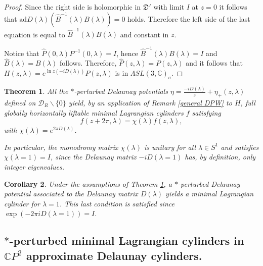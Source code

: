 \documentclass[a4paper,11pt]{amsart}
\newtheorem{theorem}{Theorem}[section]
\newtheorem{corollary}[theorem]{Corollary}
\theoremstyle{definition}
\numberwithin{equation}{section}
\newcommand{\C}{\mathbb{C}}
\begin{document}
\begin{proof}
Since the right side is holomorphic in $\mathfrak{D}'$ with limit $I$ at $z = 0$ it follows that $\mathrm{ad} D(\lambda) (\hat{B}^{-1}(\lambda)B(\lambda))=0$ holds.
Therefore the left side of the last equation is equal to  $\hat{B}^{-1}(\lambda) B(\lambda)$ and 
  constant in $z$.
 
 
  
  Notice that $\hat{P}(0, \lambda)P^{-1}(0, \lambda)=I$, hence $\hat{B}^{-1}(\lambda) B(\lambda)=I$ and $\hat{B}(\lambda)=B(\lambda)$ follows. Therefore, $\hat{P}(z,\lambda)=P(z,\lambda)$
  and it follows that $H(z,\lambda)=e^{\ln z (-iD(\lambda))}P(z,\lambda)$ is in $\Lambda SL(3,\mathbb{C})_{\sigma}$. 
 \end{proof}
 

\begin{theorem}\label{cor:1} 
All the  $*$-perturbed Delaunay potentials $\eta=\frac{-i D(\lambda)}{z}+\eta_+(z,\lambda)$ defined on $\mathcal{D}_R\backslash\{0\}$ 
yield, by an application of Remark \ref{general DPW}  to $H$,  full globally horizontally liftable minimal Lagrangian 
cylinders  $f$ satisfying 
$$f(z + 2 \pi,\lambda)=\chi(\lambda)f(z,\lambda),$$
with $\chi(\lambda)=e^{2\pi D(\lambda)}$.

In particular, the monodromy matrix $\chi(\lambda)$ is unitary for all $\lambda \in S^1$ and satisfies
$\chi(\lambda= 1)=I$, since
the Delaunay matrix $-i D(\lambda=1)$ has, by definition,  only integer eigenvalues.
\end{theorem}


\begin{corollary}Under the assumptions of Theorem  \ref{cor:1}, a $*$-perturbed Delaunay potential associated to the Delaunay matrix $D(\lambda)$ yields a minimal Lagrangian cylinder for $\lambda=1$.
This last condition is satisfied since $\exp(-2\pi i D(\lambda=1))=I$.
\end{corollary}


\subsection{$*$-perturbed  minimal Lagrangian cylinders in \texorpdfstring{$\C P^2$}{} approximate Delaunay cylinders.}
\end{document}
